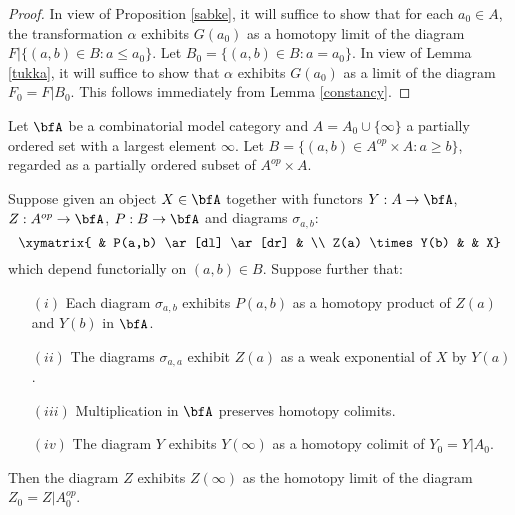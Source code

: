\begin{proof}
In view of Proposition \ref{sabke}, it will suffice to show that
for each $a_0 \in A$, the transformation $\alpha$ exhibits
$G(a_0)$ as a homotopy limit of the diagram
$F | \{ (a,b) \in B: a \leq a_0 \}$. 
Let $B_0 = \{ (a,b) \in B: a = a_0 \}$. In view of Lemma \ref{tukka}, it will
suffice to show that $\alpha$ exhibits $G(a_0)$ as a limit of the diagram
$F_0 = F | B_0$. This follows immediately from Lemma \ref{constancy}.
\end{proof}

\begin{proposition}\label{psygood}
Let $\bfA$ be a combinatorial model category and $A = A_0 \cup \{ \infty \}$
a partially ordered set with a largest element $\infty$. Let 
$B = \{ (a,b) \in A^{op} \times A: a \geq b \}$, regarded as a partially ordered subset
of $A^{op} \times A$. 

Suppose given an object $X \in \bfA$ together with functors
$Y: A \rightarrow \bfA$, $Z: A^{op} \rightarrow \bfA$,
$P: B \rightarrow \bfA$ and diagrams $\sigma_{a,b}$: 
$$ \xymatrix{ & P(a,b) \ar[dl] \ar[dr] & \\
Z(a) \times Y(b) & & X}$$
which depend functorially on $(a,b) \in B$.
Suppose further that:
\begin{itemize}
\item[$(i)$] Each diagram $\sigma_{a,b}$ exhibits $P(a,b)$ as a homotopy product
of $Z(a)$ and $Y(b)$ in $\bfA$.

\item[$(ii)$] The diagrams $\sigma_{a,a}$ exhibit $Z(a)$ as a weak exponential
of $X$ by $Y(a)$.

\item[$(iii)$] Multiplication in $\bfA$ preserves homotopy colimits.

\item[$(iv)$] The diagram $Y$ exhibits $Y(\infty)$ as a homotopy colimit of
$Y_0 = Y|A_0$.
\end{itemize}
Then the diagram $Z$ exhibits $Z(\infty)$ as the homotopy limit of
the diagram $Z_0 = Z | A_0^{op}$. 
\end{proposition}


